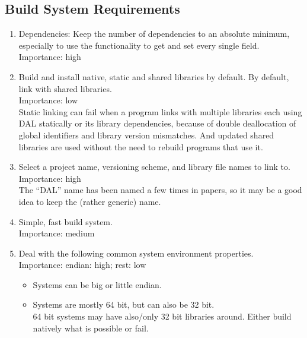 \documentclass[a4paper,11pt]{article}
\begin{document}
\subsection{Build System Requirements} \label{sec:build_system_reqs}
\begin{enumerate}[resume, label=\it R.\arabic{*}]
\itemsep0em

\item \label{req:min_deps} Dependencies: Keep the number of dependencies to an absolute minimum, especially to use the functionality to get and set every single field.\\
Importance: high\\

\item \label{req:libs} Build and install native, static and shared libraries by default. By default, link with shared libraries.\\
Importance: low\\
Static linking can fail when a program links with multiple libraries each using DAL statically or its library dependencies, because of double deallocation of global identifiers and library version mismatches.
And updated shared libraries are used without the need to rebuild programs that use it.

\item \label{req:naming_versioning} Select a project name, versioning scheme, and library file names to link to.\\
Importance: high\\
The ``DAL'' name has been named a few times in papers, so it may be a good idea to keep the (rather generic) name.

\item \label{req:build_complexity} Simple, fast build system.\\
Importance: medium\\

\item \label{req:sys_env} Deal with the following common system environment properties.\\
Importance: endian: high; rest: low
\begin{itemize}
\itemsep0em

\item Systems can be big or little endian.

\item Systems are mostly 64 bit, but can also be 32 bit.\\
64 bit systems may have also/only 32 bit libraries around. Either build natively what is possible or fail.


\end{itemize}
\end{enumerate}
\end{document}
